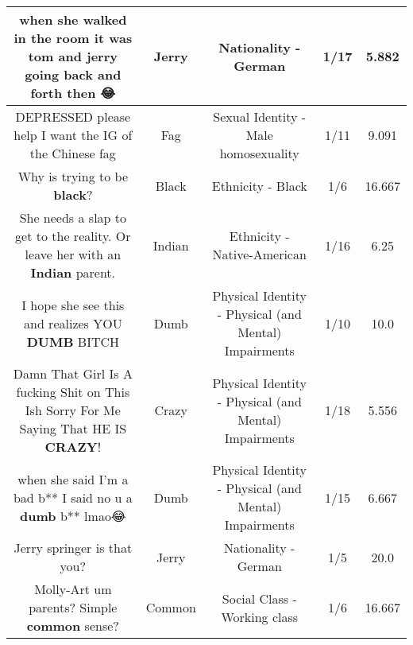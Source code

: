 \documentclass[11pt]{article}
\newlength\mylength
\begin{document}
\begin{center}
\begin{longtable}{|C{.65\mylength}|C{.30\mylength}|C{.12\mylength}|C{.12\mylength}|C{.12\mylength}|}
  \small when she walked in the room it was tom and \textbf{jerry} going back and forth then 😂\normalsize   & Jerry & Nationality - German & 1/17 & 5.882 \\  \hline
  \small DEPRESSED please help I want the IG of the Chinese fag\normalsize   & Fag & Sexual Identity - Male homosexuality & 1/11 & 9.091 \\  \hline
  \small Why is trying to be \textbf{black}?\normalsize   & Black & Ethnicity - Black & 1/6 & 16.667 \\  \hline
  \small She needs a slap to get to the reality. Or leave her with an \textbf{Indian} parent.\normalsize   & Indian & Ethnicity - Native-American & 1/16 & 6.25 \\  \hline
  \small I hope she see this and realizes YOU \textbf{DUMB} BITCH\normalsize   & Dumb & Physical Identity - Physical (and Mental) Impairments & 1/10 & 10.0 \\  \hline
  \small Damn That Girl  Is A fucking Shit on This Ish Sorry For Me Saying That HE IS \textbf{CRAZY}!\normalsize   & Crazy & Physical Identity - Physical (and Mental) Impairments & 1/18 & 5.556 \\  \hline
  \small when she said I'm a bad b** I said no u a \textbf{dumb} b** lmao😂\normalsize   & Dumb & Physical Identity - Physical (and Mental) Impairments & 1/15 & 6.667 \\  \hline
  \small Jerry springer is that you?\normalsize   & Jerry & Nationality - German & 1/5 & 20.0 \\  \hline
  \small Molly-Art um parents? Simple \textbf{common} sense?\normalsize   & Common & Social Class - Working class & 1/6 & 16.667 \\  \hline

\end{longtable}
\end{center}
\end{document}
